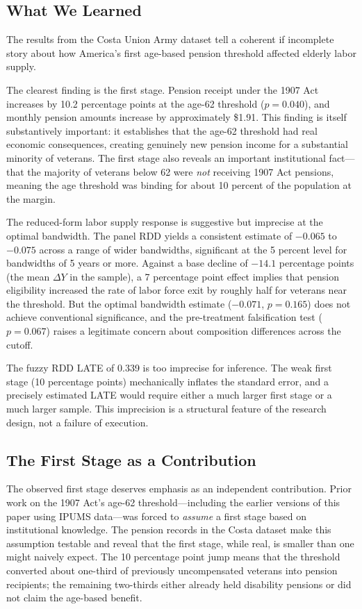 \documentclass[12pt]{article}
\begin{document}
\subsection{What We Learned}

The results from the Costa Union Army dataset tell a coherent if incomplete story about how America's first age-based pension threshold affected elderly labor supply.

The clearest finding is the first stage. Pension receipt under the 1907 Act increases by 10.2 percentage points at the age-62 threshold ($p = 0.040$), and monthly pension amounts increase by approximately \$1.91. This finding is itself substantively important: it establishes that the age-62 threshold had real economic consequences, creating genuinely new pension income for a substantial minority of veterans. The first stage also reveals an important institutional fact---that the majority of veterans below 62 were \textit{not} receiving 1907 Act pensions, meaning the age threshold was binding for about 10 percent of the population at the margin.

The reduced-form labor supply response is suggestive but imprecise at the optimal bandwidth. The panel RDD yields a consistent estimate of $-0.065$ to $-0.075$ across a range of wider bandwidths, significant at the 5 percent level for bandwidths of 5 years or more. Against a base decline of $-14.1$ percentage points (the mean $\Delta Y$ in the sample), a 7 percentage point effect implies that pension eligibility increased the rate of labor force exit by roughly half for veterans near the threshold. But the optimal bandwidth estimate ($-0.071$, $p = 0.165$) does not achieve conventional significance, and the pre-treatment falsification test ($p = 0.067$) raises a legitimate concern about composition differences across the cutoff.

The fuzzy RDD LATE of 0.339 is too imprecise for inference. The weak first stage (10 percentage points) mechanically inflates the standard error, and a precisely estimated LATE would require either a much larger first stage or a much larger sample. This imprecision is a structural feature of the research design, not a failure of execution.

\subsection{The First Stage as a Contribution}

The observed first stage deserves emphasis as an independent contribution. Prior work on the 1907 Act's age-62 threshold---including the earlier versions of this paper using IPUMS data---was forced to \textit{assume} a first stage based on institutional knowledge. The pension records in the Costa dataset make this assumption testable and reveal that the first stage, while real, is smaller than one might naively expect. The 10 percentage point jump means that the threshold converted about one-third of previously uncompensated veterans into pension recipients; the remaining two-thirds either already held disability pensions or did not claim the age-based benefit.
\end{document}
